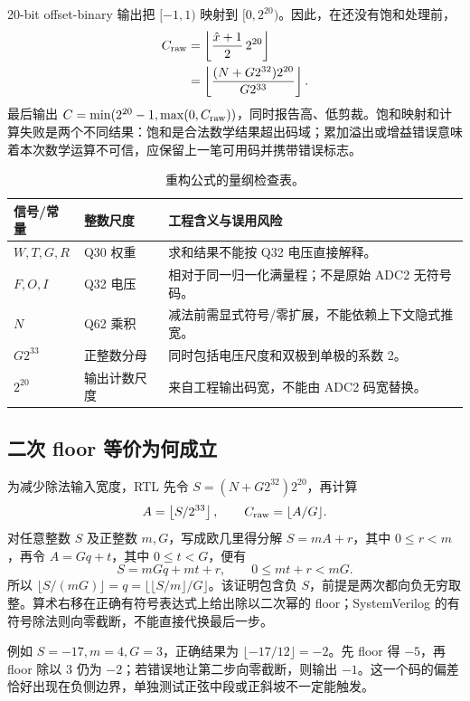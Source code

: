 20-bit offset-binary 输出把 \([-1,1)\) 映射到 \([0,2^{20})\)。因此，在还没有饱和处理前，
\begin{align}
C_{\rm raw}
&=\left\lfloor\frac{\hat x+1}{2}\,2^{20}\right\rfloor\\
&=\left\lfloor\frac{(N+G2^{32})2^{20}}{G2^{33}}\right\rfloor.
\end{align}
最后输出 \(C=\min(2^{20}-1,\max(0,C_{\rm raw}))\)，同时报告高、低剪裁。饱和映射和计算失败是两个不同结果：饱和是合法数学结果超出码域；累加溢出或增益错误意味着本次数学运算不可信，应保留上一笔可用码并携带错误标志。

\begin{table}[htbp]\centering\small
\begin{tabularx}{\textwidth}{p{29mm}p{29mm}X}\toprule
信号/常量&整数尺度&工程含义与误用风险\\\midrule
\(W,T,G,R\)&Q30 权重&求和结果不能按 Q32 电压直接解释。\\
\(F,O,I\)&Q32 电压&相对于同一归一化满量程；不是原始 ADC2 无符号码。\\
\(N\)&Q62 乘积&减法前需显式符号/零扩展，不能依赖上下文隐式推宽。\\
\(G2^{33}\)&正整数分母&同时包括电压尺度和双极到单极的系数 2。\\
\(2^{20}\)&输出计数尺度&来自工程输出码宽，不能由 ADC2 码宽替换。\\
\bottomrule\end{tabularx}
\caption{重构公式的量纲检查表。}
\end{table}

\subsection{二次 floor 等价为何成立}
为减少除法输入宽度，RTL 先令 \(S=(N+G2^{32})2^{20}\)，再计算
\begin{equation}
A=\left\lfloor S/2^{33}\right\rfloor,
\qquad C_{\rm raw}=\lfloor A/G\rfloor.
\end{equation}
对任意整数 \(S\) 及正整数 \(m,G\)，写成欧几里得分解 \(S=mA+r\)，其中 \(0\le r<m\)，再令 \(A=Gq+t\)，其中 \(0\le t<G\)，便有
\begin{equation}
S=mGq+mt+r,\qquad 0\le mt+r<mG.
\end{equation}
所以 \(\lfloor S/(mG)\rfloor=q=\lfloor\lfloor S/m\rfloor/G\rfloor\)。该证明包含负 \(S\)，前提是两次都向负无穷取整。算术右移在正确有符号表达式上给出除以二次幂的 floor；SystemVerilog 的有符号除法则向零截断，不能直接代换最后一步。

例如 \(S=-17,m=4,G=3\)，正确结果为 \(\lfloor-17/12\rfloor=-2\)。先 floor 得 \(-5\)，再 floor 除以 3 仍为 \(-2\)；若错误地让第二步向零截断，则输出 \(-1\)。这一个码的偏差恰好出现在负侧边界，单独测试正弦中段或正斜坡不一定能触发。

